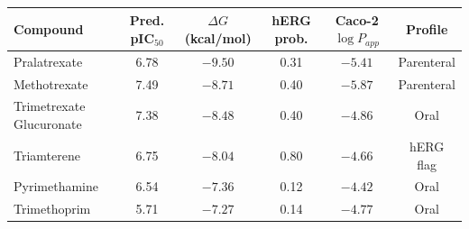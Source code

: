 \begin{tabular}{lccccc}
\toprule
\textbf{Compound} & \textbf{Pred. pIC$_{50}$} & \textbf{$\Delta G$ (kcal/mol)} & \textbf{hERG prob.} & \textbf{Caco-2 $\log P_{app}$} & \textbf{Profile} \\
\midrule
Pralatrexate & 6.78 & $-9.50$ & 0.31 & $-5.41$ & Parenteral \\
Methotrexate & 7.49 & $-8.71$ & 0.40 & $-5.87$ & Parenteral \\
Trimetrexate Glucuronate & 7.38 & $-8.48$ & 0.40 & $-4.86$ & Oral \\
Triamterene & 6.75 & $-8.04$ & 0.80 & $-4.66$ & hERG flag \\
Pyrimethamine & 6.54 & $-7.36$ & 0.12 & $-4.42$ & Oral \\
Trimethoprim & 5.71 & $-7.27$ & 0.14 & $-4.77$ & Oral \\
\bottomrule
\end{tabular}
